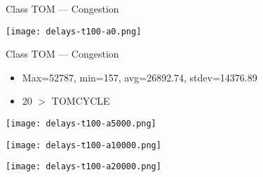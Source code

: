 \begin{frame}[fragile]{Class TOM --- Congestion}
\noindent
\centerline{\texttt{[image: delays-t100-a0.png]}}

\end{frame}
\begin{frame}[fragile]{Class TOM --- Congestion}
\begin{itemize}
\item Max=52787, min=157, avg=26892.74, stdev=14376.89
\item 20 $>$ {\sf TOM\UNDSCR{}CYCLE}
\end{itemize}


\end{frame}
\begin{frame}[fragile]{ }
\noindent
%

\centerline{\texttt{[image: delays-t100-a5000.png]}}
\end{frame}
\begin{frame}[fragile]{ }
\centerline{\texttt{[image: delays-t100-a10000.png]}}
\end{frame}
\begin{frame}[fragile]{ }
\centerline{\texttt{[image: delays-t100-a20000.png]}}
\end{frame}


